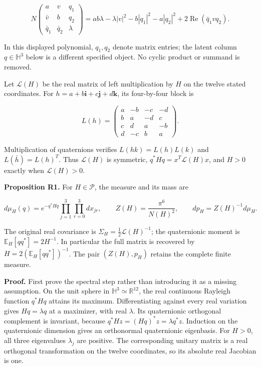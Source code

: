\documentclass[
  11pt,
]{article}
\begin{document}
\[
N\!\begin{pmatrix}a&v&q_1\\\bar v&b&q_2\\\bar q_1&\bar q_2&\lambda\end{pmatrix}
=ab\lambda-\lambda|v|^2-b|q_1|^2-a|q_2|^2
+2\operatorname{Re}(\bar q_1vq_2).
\]

In this displayed polynomial, \(q_1,q_2\) denote matrix entries; the
latent column \(q\in\mathbb H^3\) below is a different specified object.
No cyclic product or summand is removed.

Let \(\mathscr L(H)\) be the real matrix of left multiplication by \(H\)
on the twelve stated coordinates. For
\(h=a+b\mathbf i+c\mathbf j+d\mathbf k\), its four-by-four block is

\[
L(h)=\begin{pmatrix}
a&-b&-c&-d\\ b&a&-d&c\\ c&d&a&-b\\ d&-c&b&a
\end{pmatrix}.
\]

Multiplication of quaternions verifies \(L(hk)=L(h)L(k)\) and
\(L(\bar h)=L(h)^T\). Thus \(\mathscr L(H)\) is symmetric,
\(q^*Hq=x^T\mathscr L(H)x\), and \(H>0\) exactly when
\(\mathscr L(H)>0\).

\textbf{Proposition R1.} For \(H\in\mathcal P\), the measure and its
mass are

\[
d\mu_H(q)=e^{-q^*Hq}\prod_{j=1}^3\prod_{r=0}^3 dx_{jr},\qquad
Z(H)=\frac{\pi^6}{N(H)^2},\qquad
dp_H=Z(H)^{-1}d\mu_H.
\]

The original real covariance is \(\Sigma_H=\frac12\mathscr L(H)^{-1}\);
the quaternionic moment is \(\mathbb E_H[qq^*]=2H^{-1}\). In particular
the full matrix is recovered by \(H=2(\mathbb E_H[qq^*])^{-1}\). The
pair \((Z(H),p_H)\) retains the complete finite measure.

\textbf{Proof.} First prove the spectral step rather than introducing it
as a missing assumption. On the unit sphere in
\(\mathbb H^3\simeq\mathbb R^{12}\), the real continuous Rayleigh
function \(q^*Hq\) attains its maximum. Differentiating against every
real variation gives \(Hq=\lambda q\) at a maximizer, with real
\(\lambda\). Its quaternionic orthogonal complement is invariant,
because \(q^*Hz=(Hq)^*z=\lambda q^*z\). Induction on the quaternionic
dimension gives an orthonormal quaternionic eigenbasis. For \(H>0\), all
three eigenvalues \(\lambda_j\) are positive. The corresponding unitary
matrix is a real orthogonal transformation on the twelve coordinates, so
its absolute real Jacobian is one.
\end{document}
